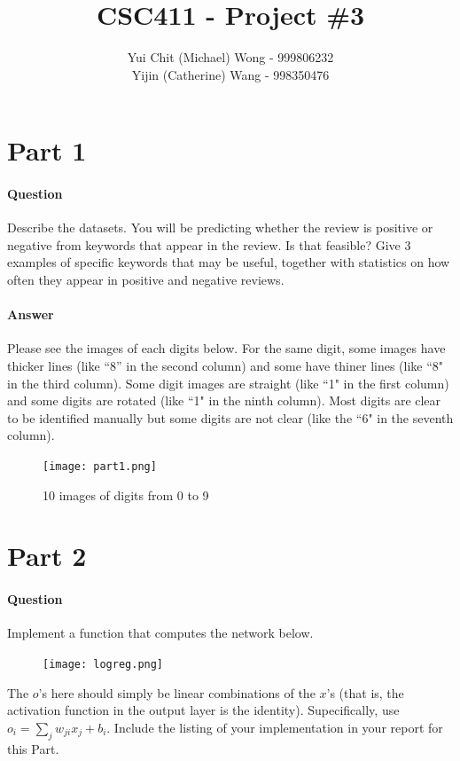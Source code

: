 \documentclass[11pt,twoside]{article}
\begin{document}
\title{CSC411 - Project \#3}
\author{Yui Chit (Michael) Wong - 999806232\\Yijin (Catherine) Wang - 998350476}
\maketitle

\clearpage

\section*{Part 1}
\paragraph{Question}
Describe the datasets. You will be predicting whether the review is positive or negative from keywords that appear in the review. Is that feasible? Give 3 examples of specific keywords that may be useful, together with statistics on how often they appear in positive and negative reviews.

\paragraph{Answer}
Please see the images of each digits below. For the same digit, some images have thicker lines (like ``8'' in the second column) and some have thiner lines (like ``8" in the third column). Some digit images are straight (like ``1" in the first column) and some digits are rotated (like ``1" in the ninth column). Most digits are clear to be identified manually but some digits are not clear (like the ``6" in the seventh column). 

\begin{figure}[h]
	\centering
	\texttt{[image: part1.png]}
	\caption*{10 images of digits from 0 to 9}
\end{figure}

\clearpage

\section*{Part 2}

\paragraph{Question}
Implement a function that computes the network below.
\begin{figure}[h]
	\centering
	\texttt{[image: logreg.png]}
\end{figure}
The $o$'s here should simply be linear combinations of the $x$'s (that is, the activation function in the output layer is the identity). Supecifically, use $o_i = \sum_{j}w_{ji}x_j+b_i$. Include the listing of your implementation in your report for this Part.
\end{document}
